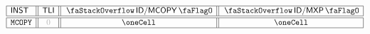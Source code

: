 \[
	\begin{array}{|l||c||c||c|}
		\hline
		\INST        & \tli  & \stackDecMcopyFlag & \stackDecMxpFlag \\ \hline\hline
		\inst{MCOPY} & \zero & \oneCell           & \oneCell         \\ \hline
	\end{array}
\]
